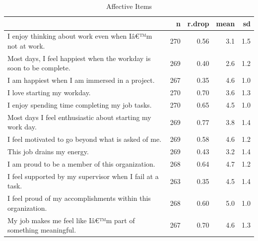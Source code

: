 \documentclass[
]{book}
\begin{document}
\begin{table}

\caption{\label{tab:rdrop1}Affective Items}
\centering
\begin{tabular}[t]{l|r|r|r|r}
\hline
  & n & r.drop & mean & sd\\
\hline
I enjoy thinking about work even when Iâ€™m not at work. & 270 & 0.56 & 3.1 & 1.5\\
\hline
Most days, I feel happiest when the workday is soon to be complete. & 269 & 0.40 & 2.6 & 1.2\\
\hline
I am happiest when I am immersed in a project. & 267 & 0.35 & 4.6 & 1.0\\
\hline
I love starting my workday. & 270 & 0.70 & 3.6 & 1.3\\
\hline
I enjoy spending time completing my job tasks. & 270 & 0.65 & 4.5 & 1.0\\
\hline
Most days I feel enthusiastic about starting my work day. & 269 & 0.77 & 3.8 & 1.4\\
\hline
I feel motivated to go beyond what is asked of me. & 269 & 0.58 & 4.6 & 1.2\\
\hline
This job drains my energy. & 269 & 0.43 & 3.2 & 1.4\\
\hline
I am proud to be a member of this organization. & 268 & 0.64 & 4.7 & 1.2\\
\hline
I feel supported by my supervisor when I fail at a task. & 263 & 0.35 & 4.5 & 1.4\\
\hline
I feel proud of my accomplishments within this organization. & 268 & 0.60 & 5.0 & 1.0\\
\hline
My job makes me feel like Iâ€™m part of something meaningful. & 267 & 0.70 & 4.6 & 1.3\\
\hline
\end{tabular}
\end{table}
\end{document}
